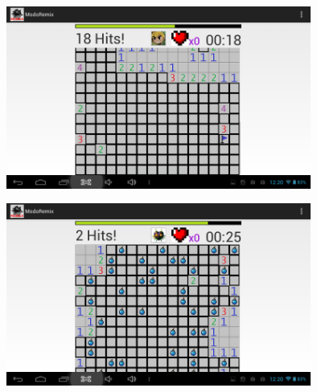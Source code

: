 \documentclass[12pt]{article}
\begin{document}
\begin{minipage}{0.1\textwidth}
\includegraphics[height=6cm,width=12cm]{remix3} 
\end{minipage}

\begin{minipage}{0.1\textwidth}
\includegraphics[height=6cm,width=12cm]{remix4} 
\end{minipage}


		
		



		
\end{document}
